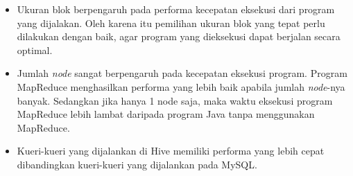 \begin{itemize}
	\item Ukuran blok berpengaruh pada performa kecepatan eksekusi dari program yang dijalakan. Oleh karena itu pemilihan ukuran blok yang tepat perlu dilakukan dengan baik, agar program yang dieksekusi dapat berjalan secara optimal.
	\item Jumlah \textit{node} sangat berpengaruh pada kecepatan eksekusi program. Program MapReduce menghasilkan performa yang lebih baik apabila jumlah \textit{node}-nya banyak. Sedangkan jika hanya 1 node saja, maka waktu eksekusi program MapReduce lebih lambat daripada program Java tanpa menggunakan MapReduce.
	\item Kueri-kueri yang dijalankan di Hive memiliki performa yang lebih cepat dibandingkan kueri-kueri yang dijalankan pada MySQL.
\end{itemize}
